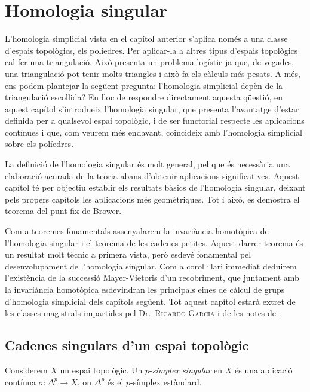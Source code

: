 \documentclass[../main.tex]{subfiles}
\begin{document}
\chapter{Homologia singular}

L'homologia simplicial vista en el capítol anterior s'aplica només a una classe d'espais topològics, els políedres. Per aplicar-la a altres tipus d'espais topològics cal fer una triangulació. Això presenta un problema logístic ja que, de vegades, una triangulació pot tenir molts triangles i això fa els càlculs més pesats. A més, ens podem plantejar la següent pregunta: l'homologia simplicial depèn de la triangulació escollida? En lloc de respondre directament aquesta qüestió, en aquest capítol s'introdueix l'homologia singular, que presenta l'avantatge d'estar definida per a qualsevol espai topològic, i de ser functorial respecte les aplicacions contínues i que, com veurem més endavant, coincideix amb l'homologia simplicial sobre els políedres.

La definició de l'homologia singular és molt general, pel que és necessària una elaboració acurada de la teoria abans d'obtenir aplicacions significatives. Aquest capítol té per objectiu establir els resultats bàsics de l'homologia singular, deixant pels propers capítols les aplicacions més geomètriques. Tot i això, es demostra el teorema del punt fix de Brower.

Com a teoremes fonamentals assenyalarem la invariància homotòpica de l'homologia singular i el teorema de les cadenes petites. Aquest darrer teorema és un resultat molt tècnic a primera vista, però esdevé fonamental pel desenvolupament de l'homologia singular. Com a corol·lari immediat deduirem l'existència de la successió Mayer-Vietoris d'un recobriment, que juntament amb la invariància homotòpica esdevindran les principals eines de càlcul de grups d'homologia simplicial dels capítols següent. Tot aquest capítol estarà extret de les classes magistrals impartides pel Dr.~\textsc{Ricardo Garcia} i de les notes de \cite{x}.

\section{Cadenes singulars d'un espai topològic}



\begin{defi} Considerem $X$ un espai topològic. Un $p$-\textit{símplex singular} en $X$ és una aplicació contínua $\sigma:\Delta^p\rightarrow X$, on $\Delta^p$ és el $p$-símplex estàndard.
\end{defi}
\end{document}
